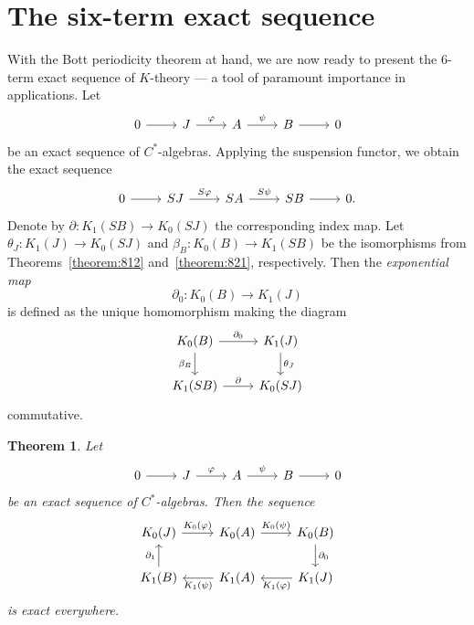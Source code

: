 \documentclass{book}
\newtheorem{theorem}[definition]{Theorem}
\def\cstars{\(C^*\)-algebras}
\begin{document}
\section{The six-term exact sequence}
With the Bott periodicity theorem at hand, we are now ready to present the 6-term exact
sequence of \(K\)-theory — a tool of paramount importance in applications. Let
\[
  \begin{tikzcd}
    0\arrow[r]&J\arrow[r,"\varphi"]&A\arrow[r,"\psi"]&B\arrow[r]&0
  \end{tikzcd}
\]
be an exact sequence of \cstars. Applying the suspension functor, we obtain the exact sequence
\[
  \begin{tikzcd}
    0\arrow[r]&S J\arrow[r,"S\varphi"]&S A\arrow[r,"S\psi"]&S B\arrow[r]&0.
  \end{tikzcd}
\]
Denote by \(\partial: K_1(S B)\rightarrow K_0(S J)\) the corresponding index map. Let \(\theta_J:K_1(J)\rightarrow K_0(S J)\)
and \(\beta_B:K_0(B)\rightarrow K_1(S B)\) be the isomorphisms from Theorems~\ref{theorem:812} and~\ref{theorem:821}, respectively.
Then the \textit{exponential map}
\[
  \partial_0:K_0(B)\rightarrow K_1(J)
\]
is defined as the unique homomorphism making the diagram 
\begin{equation}\label{diag:838}
  \begin{tikzcd}
    K_0(B)\arrow[r,"\partial_0"]\arrow[d,"\beta_B",swap]&K_1(J)\arrow[d,"\theta_J"]\\
    K_1(S B)\arrow[r,"\partial"]&K_0(S J)
  \end{tikzcd}
\end{equation}
commutative.
\begin{theorem}\label{theorem:839}
  Let 
  \[
    \begin{tikzcd}
      0\arrow[r]&J\arrow[r,"\varphi"]&A\arrow[r,"\psi"]&B\arrow[r]&0
    \end{tikzcd}
  \]
  be an exact sequence of \cstars. Then the sequence 
  \begin{equation}\label{diag:839}
    \begin{tikzcd}
      K_0(J)\arrow[r,"K_0(\varphi)"]&K_0(A)\arrow[r,"K_0(\psi)"]&K_0(B)\arrow[d,"\partial_0"]\\
      K_1(B)\arrow[u,"\partial_1"]&K_1(A)\arrow[l,"K_1(\psi)"]&K_1(J)\arrow[l,"K_1(\varphi)"]
    \end{tikzcd}
  \end{equation}
  is exact everywhere.
\end{theorem}
\end{document}
